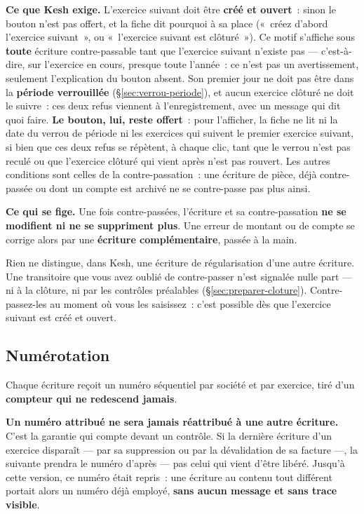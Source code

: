 \documentclass[a4paper,11pt,oneside]{article}
\begin{document}
\textbf{Ce que Kesh exige.} L'exercice suivant doit être \textbf{créé et ouvert}~: sinon le
bouton n'est pas offert, et la fiche dit pourquoi à sa place («~créez d'abord l'exercice
suivant~», ou «~l'exercice suivant est clôturé~»). Ce motif s'affiche sous \textbf{toute}
écriture contre-passable tant que l'exercice suivant n'existe pas --- c'est-à-dire, sur
l'exercice en cours, presque toute l'année~: ce n'est pas un avertissement, seulement
l'explication du bouton absent. Son premier jour ne doit pas être dans la
\textbf{période verrouillée} (\S\ref{sec:verrou-periode}), et aucun exercice clôturé ne doit le
suivre~: ces deux refus viennent à l'enregistrement, avec un message qui dit quoi faire.
\textbf{Le bouton, lui, reste offert}~: pour l'afficher, la fiche ne lit ni la date du verrou
de période ni les exercices qui suivent le premier exercice suivant, si bien que ces deux refus
se répètent, à chaque clic, tant que le verrou n'est pas reculé ou que l'exercice clôturé qui
vient après n'est pas rouvert. Les
autres conditions sont celles de la contre-passation~: une écriture de pièce, déjà contre-passée
ou dont un compte est archivé ne se contre-passe pas plus ainsi.

\textbf{Ce qui se fige.} Une fois contre-passées, l'écriture et sa contre-passation \textbf{ne
se modifient ni ne se suppriment plus}. Une erreur de montant ou de compte se corrige alors par
une \textbf{écriture complémentaire}, passée à la main.

\begin{keshwarning}[title={\faExclamationTriangle\ Kesh ne repère pas une transitoire oubliée}]
Rien ne distingue, dans Kesh, une écriture de régularisation d'une autre écriture. Une
transitoire que vous avez oublié de contre-passer n'est signalée nulle part --- ni à la
clôture, ni par les contrôles préalables (\S\ref{sec:preparer-cloture}). Contre-passez-les au
moment où vous les saisissez~: c'est possible dès que l'exercice suivant est créé et ouvert.
\end{keshwarning}

\subsection{Numérotation}

Chaque écriture reçoit un numéro séquentiel par société et par exercice, tiré d'un
\textbf{compteur qui ne redescend jamais}.

\textbf{Un numéro attribué ne sera jamais réattribué à une autre écriture.} C'est la
garantie qui compte devant un contrôle. Si la dernière écriture d'un exercice disparaît --- par
sa suppression ou par la dévalidation de sa facture ---, la suivante prendra le numéro d'après --- pas celui qui vient d'être libéré.
Jusqu'à cette version, ce numéro était repris~: une écriture au contenu tout différent
portait alors un numéro déjà employé, \textbf{sans aucun message et sans trace visible}.
\end{document}
